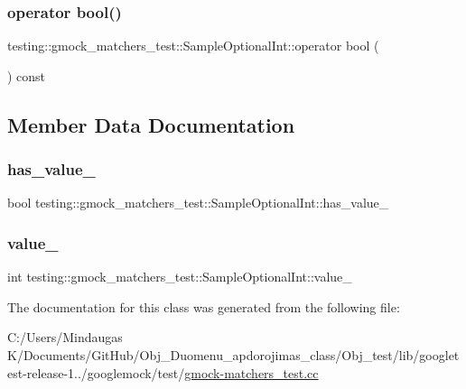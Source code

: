 \subsubsection{\texorpdfstring{operator bool()}{operator bool()}}
{\footnotesize\ttfamily testing\+::gmock\+\_\+matchers\+\_\+test\+::\+Sample\+Optional\+Int\+::operator bool (\begin{DoxyParamCaption}{ }\end{DoxyParamCaption}) const\hspace{0.3cm}{\ttfamily [inline]}}



\subsection{Member Data Documentation}
\mbox{\label{classtesting_1_1gmock__matchers__test_1_1_sample_optional_int_a5910c497044c5f7bee428a796917d306}} 
\subsubsection{\texorpdfstring{has\_value\_}{has\_value\_}}
{\footnotesize\ttfamily bool testing\+::gmock\+\_\+matchers\+\_\+test\+::\+Sample\+Optional\+Int\+::has\+\_\+value\+\_\+\hspace{0.3cm}{\ttfamily [private]}}

\mbox{\label{classtesting_1_1gmock__matchers__test_1_1_sample_optional_int_a0131764dc86ee2be004977be64e6b418}} 
\subsubsection{\texorpdfstring{value\_}{value\_}}
{\footnotesize\ttfamily int testing\+::gmock\+\_\+matchers\+\_\+test\+::\+Sample\+Optional\+Int\+::value\+\_\+\hspace{0.3cm}{\ttfamily [private]}}



The documentation for this class was generated from the following file\+:\begin{DoxyCompactItemize}
\item 
C\+:/\+Users/\+Mindaugas K/\+Documents/\+Git\+Hub/\+Obj\+\_\+\+Duomenu\+\_\+apdorojimas\+\_\+class/\+Obj\+\_\+test/lib/googletest-\/release-\/1../googlemock/test/\mbox{\hyperlink{_obj__test_2lib_2googletest-release-1_88_81_2googlemock_2test_2gmock-matchers__test_8cc}{gmock-\/matchers\+\_\+test.\+cc}}\end{DoxyCompactItemize}
